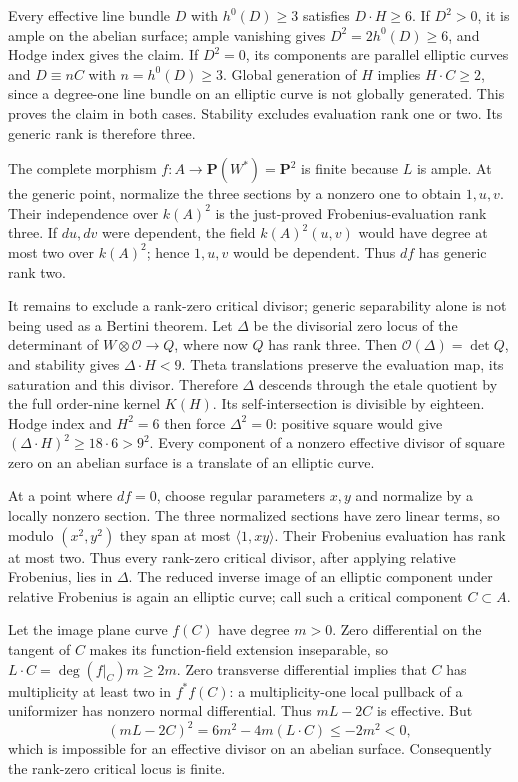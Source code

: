 Every effective line bundle \(D\) with \(h^0(D)\ge3\) satisfies
\(D\cdot H\ge6\). If \(D^2>0\), it is ample on the abelian
surface; ample vanishing gives \(D^2=2h^0(D)\ge6\), and Hodge
index gives the claim. If \(D^2=0\), its components are parallel
elliptic curves and \(D\equiv nC\) with \(n=h^0(D)\ge3\).
Global generation of \(H\) implies \(H\cdot C\ge2\), since a
degree-one line bundle on an elliptic curve is not globally generated.
This proves the claim in both cases. Stability excludes evaluation
rank one or two. Its generic rank is therefore three.

The complete morphism \(f:A\to\mathbf P(W^*)=\mathbf P^2\) is
finite because \(L\) is ample. At the generic point, normalize the
three sections by a nonzero one to obtain \(1,u,v\). Their independence
over \(k(A)^2\) is the just-proved Frobenius-evaluation rank three.
If \(du,dv\) were dependent, the field \(k(A)^2(u,v)\) would have
degree at most two over \(k(A)^2\); hence \(1,u,v\) would be dependent.
Thus \(df\) has generic rank two.

It remains to exclude a rank-zero critical divisor; generic
separability alone is not being used as a Bertini theorem. Let
\(\Delta\) be the divisorial zero locus of the determinant of
\(W\otimes\mathcal O\to Q\), where now \(Q\) has rank three.
Then \(\mathcal O(\Delta)=\det Q\), and stability gives
\(\Delta\cdot H<9\). Theta translations preserve the evaluation
map, its saturation and this divisor. Therefore \(\Delta\) descends
through the etale quotient by the full order-nine kernel \(K(H)\).
Its self-intersection is divisible by eighteen. Hodge index and
\(H^2=6\) then force \(\Delta^2=0\): positive square would give
\((\Delta\cdot H)^2\ge18\cdot6>9^2\).
Every component of a nonzero effective divisor of square zero on an
abelian surface is a translate of an elliptic curve.

At a point where \(df=0\), choose regular parameters \(x,y\) and
normalize by a locally nonzero section. The three normalized sections
have zero linear terms, so modulo \((x^2,y^2)\) they span at most
\(\langle1,xy\rangle\). Their Frobenius evaluation has rank at most
two. Thus every rank-zero critical divisor, after applying relative
Frobenius, lies in \(\Delta\). The reduced inverse image of an
elliptic component under relative Frobenius is again an elliptic curve;
call such a critical component \(C\subset A\).

Let the image plane curve \(f(C)\) have degree \(m>0\). Zero
differential on the tangent of \(C\) makes its function-field
extension inseparable, so
\(L\cdot C=\deg(f|_C)m\ge2m\). Zero transverse differential
implies that \(C\) has multiplicity at least two in \(f^*f(C)\):
a multiplicity-one local pullback of a uniformizer has nonzero normal
differential. Thus \(mL-2C\) is effective. But
\[
             (mL-2C)^2=6m^2-4m(L\cdot C)\le-2m^2<0,
\]
which is impossible for an effective divisor on an abelian surface.
Consequently the rank-zero critical locus is finite.

